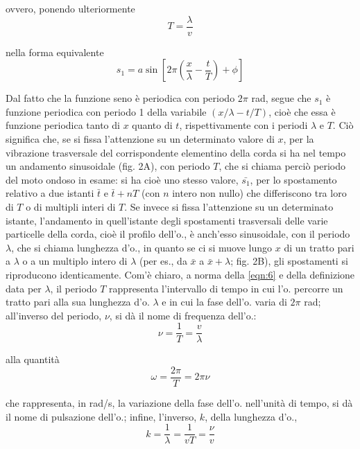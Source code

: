 \documentclass[a4paper]{article}
\begin{document}
ovvero, ponendo ulteriormente 
\begin{equation}
\label{eqn:6}
T=\frac{\lambda}{v}
\end{equation}

nella forma equivalente 
\begin{equation}
\label{eqn:7}
s_1=a\sin [2\pi(\frac{x}{\lambda}-\frac{t}{T})+\phi]
\end{equation}

Dal fatto che la funzione seno è periodica con periodo $2\pi$ rad, segue che $s_1$ è funzione periodica con periodo 1 della variabile $(x/\lambda-t/T)$, cioè che essa è funzione periodica tanto di $x$ quanto di $t$, rispettivamente con i periodi $\lambda$ e $T$. Ciò significa che, se si fissa l'attenzione su un determinato valore di $x$, per la vibrazione trasversale del corrispondente elementino della corda si ha nel tempo un andamento sinusoidale (fig. 2A), con periodo $T$, che si chiama perciò periodo del moto ondoso in esame: si ha cioè uno stesso valore, $\bar{s_1}$, per lo spostamento relativo a due istanti $\bar{t}$ e $\bar{t} + nT$ (con $n$ intero non nullo) che differiscono tra loro di $T$ o di multipli interi di $T$.
Se invece si fissa l'attenzione su un determinato istante, l'andamento in quell'istante degli spostamenti trasversali delle varie particelle della corda, cioè il profilo dell'o., è anch'esso sinusoidale, con il periodo $\lambda$, che si chiama lunghezza d'o., in quanto se ci si muove lungo $x$ di un tratto pari a $\lambda$ o a un multiplo intero di $\lambda$ (per es., da $\bar{x}$ a $\bar{x}+\lambda$; fig. 2B), gli spostamenti si riproducono identicamente. Com'è chiaro, a norma della \eqref{eqn:6} e della definizione data per $\lambda$, il periodo $T$ rappresenta l'intervallo di tempo in cui l'o. percorre un tratto pari alla sua lunghezza d'o. $\lambda$ e in cui la fase dell'o. varia di $2\pi$ rad; all'inverso del periodo, $\nu$, si dà il nome di frequenza dell'o.: 
\begin{equation}
\label{eqn:8}
\nu=\frac{1}{T}=\frac{v}{\lambda}
\end{equation}

alla quantità
\begin{equation}
\label{eqn:9}
\omega=\frac{2\pi}{T}=2\pi\nu
\end{equation}

che rappresenta, in rad/s, la variazione della fase dell'o. nell'unità di tempo, si dà il nome di pulsazione dell'o.; infine, l'inverso, $k$, della lunghezza d'o., 
\begin{equation}
\label{eqn:10}
k=\frac{1}{\lambda}=\frac{1}{vT}=\frac{\nu}{v}
\end{equation}
\end{document}
